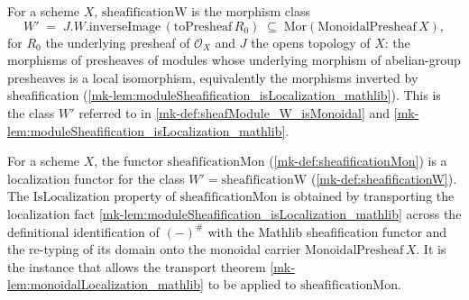 \begin{definition}\label{mk-def:sheafificationW}
  \leanok

  For a scheme \(X\), \(\mathrm{sheafificationW}\) is the morphism class
  \[
    W' \;=\; J.W.\mathrm{inverseImage}\,(\mathrm{toPresheaf}\,R_0)
      \;\subseteq\; \mathrm{Mor}(\mathrm{MonoidalPresheaf}\,X),
  \]
  for \(R_0\) the underlying presheaf of \(\mathcal{O}_X\) and \(J\) the opens
  topology of \(X\): the morphisms of presheaves of modules whose underlying
  morphism of abelian-group presheaves is a local isomorphism, equivalently the
  morphisms inverted by sheafification
  (\ref{mk-lem:moduleSheafification_isLocalization_mathlib}). This is the class
  \(W'\) referred to in \ref{mk-def:sheafModule_W_isMonoidal} and
  \ref{mk-lem:moduleSheafification_isLocalization_mathlib}.
\end{definition}

\begin{lemma}\label{mk-def:sheafificationMon_isLocalization}
  \leanok

  For a scheme \(X\), the functor \(\mathrm{sheafificationMon}\)
  (\ref{mk-def:sheafificationMon}) is a localization functor for the class
  \(W' = \mathrm{sheafificationW}\) (\ref{mk-def:sheafificationW}). The
  \(\mathrm{IsLocalization}\) property of \(\mathrm{sheafificationMon}\) is
  obtained by transporting the localization fact
  \ref{mk-lem:moduleSheafification_isLocalization_mathlib} across the definitional
  identification of \((-)^{\#}\) with the Mathlib sheafification functor and the
  re-typing of its domain onto the monoidal carrier \(\mathrm{MonoidalPresheaf}\,X\).
  It is the instance that allows the transport theorem
  \ref{mk-lem:monoidalLocalization_mathlib} to be applied to
  \(\mathrm{sheafificationMon}\).
\end{lemma}

